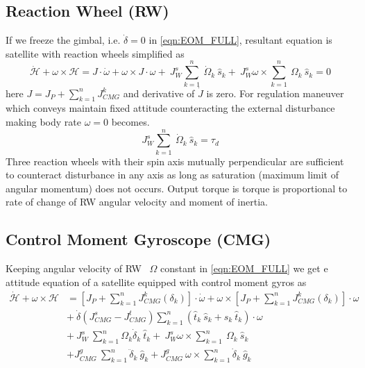 \subsection{Reaction Wheel (RW)}
If we freeze the gimbal, i.e. $\displaystyle \dot{\delta} =0$ in \autoref{eqn:EOM_FULL}, resultant equation is satellite with reaction wheels simplified as
\begin{equation}
\dot{\mathcal{H}} +\omega \times \mathcal{H} =J \cdotp \dot{\omega } +\omega \times J \cdotp \omega +\ J^{s}_{W}\sum ^{n}_{k=1} \ \dot{\Omega }_{k} \ \hat{s}_{k} +\ J^{s}_{W} \omega \times \sum ^{n}_{k=1} \ \Omega _{k} \ \hat{s}_{k} =0
\end{equation}
here $\displaystyle J=J_{P} +\sum ^{n}_{k=1} J^{k}_{CMG}$ and derivative of $\displaystyle \dot{J}$ is zero. For regulation maneuver which conveys maintain fixed attitude counteracting the external disturbance making body rate $\displaystyle \omega =0$ becomes.
\begin{equation}
J^{s}_{W}\sum ^{n}_{k=1} \ \dot{\Omega }_{k} \ \hat{s}_{k} =\tau _{d}
\end{equation}
Three reaction wheels with their spin axis mutually perpendicular are sufficient to counteract disturbance in any axis as long as saturation (maximum limit of angular momentum) does not occurs. Output torque is torque is proportional to rate of change of RW angular velocity and moment of inertia.

\subsection{Control Moment Gyroscope (CMG)}
Keeping angular velocity of RW \ $\displaystyle \Omega $ constant in \autoref{eqn:EOM_FULL} we get e attitude equation of a satellite equipped with control moment gyros as 
\begin{equation}
\begin{aligned}
\dot{\mathcal{H}} +\omega \times \mathcal{H} & =\left[ J_{P} +\sum ^{n}_{k=1} J^{k}_{CMG}( \delta_{k})\right] \cdotp \dot{\omega } +\omega \times \left[ J_{P} +\sum ^{n}_{k=1} J^{k}_{CMG}( \delta_{k})\right] \cdotp \omega \\
 & +\ \dot{\delta}\left( J^{s}_{CMG} -J^{t}_{CMG}\right)\sum ^{n}_{k=1}(\hat{t}_{k} \ \hat{s}_{k} +\hat{s}_{k} \ \hat{t}_{k}) \cdotp \omega \\
 & +\ J^{s}_{W} \ \sum ^{n}_{k=1} \Omega _{k}\dot{\delta}_{k} \ \hat{t}_{k} +\ J^{s}_{W} \omega \times \sum ^{n}_{k=1} \ \Omega _{k} \ \hat{s}_{k}\\
 & +J^{g}_{CMG} \ \sum ^{n}_{k=1}\ddot{\delta}_{k} \ \hat{g}_{k} +J^{g}_{CMG} \ \omega \times \sum ^{n}_{k=1}\dot{\delta}_{k} \ \hat{g}_{k}
\end{aligned}
\end{equation}


